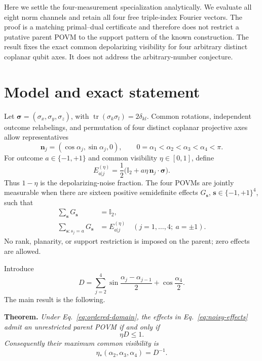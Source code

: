 \documentclass[aps,pra,reprint,superscriptaddress,nofootinbib,longbibliography]{revtex4-2}
\newcommand{\id}{\mathbb I_2}
\newcommand{\bn}{\bm n}
\begin{document}
Here we settle the four-measurement specialization analytically.  We evaluate
all eight norm channels and retain all four free triple-index Fourier vectors.
The proof is a matching primal--dual certificate and therefore does not
restrict a putative parent POVM to the support pattern of the known
construction.  The result fixes the exact common depolarizing visibility for
four arbitrary distinct coplanar qubit axes.  It does not address the
arbitrary-number conjecture.

\section{Model and exact statement}
\label{sec:model}

Let $\bm\sigma=(\sigma_x,\sigma_y,\sigma_z)$, with
$\operatorname{tr}(\sigma_k\sigma_l)=2\delta_{kl}$.  Common rotations,
independent outcome relabelings, and permutation of four distinct coplanar
projective axes allow representatives
\begin{equation}
  \bn_j=(\cos\alpha_j,\sin\alpha_j,0),\qquad
  0=\alpha_1<\alpha_2<\alpha_3<\alpha_4<\pi .
  \label{eq:ordered-domain}
\end{equation}
For outcome $a\in\{-1,+1\}$ and common visibility $\eta\in[0,1]$, define
\begin{equation}
 E_{a|j}^{(\eta)}
 =\frac12\bigl(\id+a\eta\,\bn_j\mathbin{\cdot}\bm\sigma\bigr).
 \label{eq:noisy-effects}
\end{equation}
Thus $1-\eta$ is the depolarizing-noise fraction.  The four POVMs are jointly
measurable when there are sixteen positive semidefinite effects
$G_{\bm s}$, $\bm s\in\{-1,+1\}^4$, such that
\begin{align}
 \sum_{\bm s}G_{\bm s}&=\id,
 \nonumber\\
 \sum_{\bm s:s_j=a}G_{\bm s}&=E_{a|j}^{(\eta)}
 \quad (j=1,\ldots,4;\ a=\pm1).
 \label{eq:parent}
\end{align}
No rank, planarity, or support restriction is imposed on the parent; zero
effects are allowed.

Introduce
\begin{equation}
 D=\sum_{j=2}^{4}\sin\frac{\alpha_j-\alpha_{j-1}}2
   +\cos\frac{\alpha_4}{2}.
 \label{eq:D-trig}
\end{equation}
The main result is the following.

\textbf{Theorem.} \emph{Under Eq.~\eqref{eq:ordered-domain}, the effects in
Eq.~\eqref{eq:noisy-effects} admit an unrestricted parent POVM if and only if
\begin{equation}
 \eta D\leq 1.
 \label{eq:threshold-criterion}
\end{equation}
Consequently their maximum common visibility is
\begin{equation}
 \eta_*(\alpha_2,\alpha_3,\alpha_4)=D^{-1}.
 \label{eq:eta-star}
\end{equation}}
\end{document}

